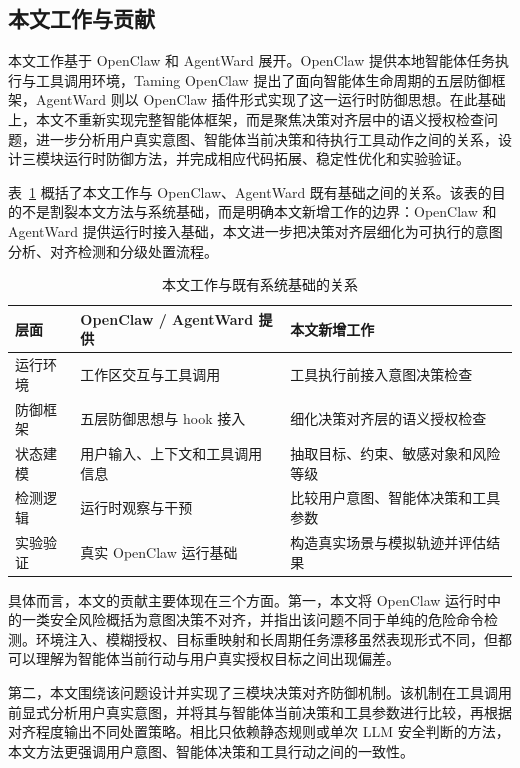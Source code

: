 \subsection{本文工作与贡献}

本文工作基于 OpenClaw 和 AgentWard 展开。OpenClaw 提供本地智能体任务执行与工具调用环境，Taming OpenClaw 提出了面向智能体生命周期的五层防御框架，AgentWard 则以 OpenClaw 插件形式实现了这一运行时防御思想\cite{openclaw2026github,deng2026taming,zhang2026agentward}。在此基础上，本文不重新实现完整智能体框架，而是聚焦决策对齐层中的语义授权检查问题，进一步分析用户真实意图、智能体当前决策和待执行工具动作之间的关系，设计三模块运行时防御方法，并完成相应代码拓展、稳定性优化和实验验证。

表~\ref{tab:chap01-contributions} 概括了本文工作与 OpenClaw、AgentWard 既有基础之间的关系。该表的目的不是割裂本文方法与系统基础，而是明确本文新增工作的边界：OpenClaw 和 AgentWard 提供运行时接入基础，本文进一步把决策对齐层细化为可执行的意图分析、对齐检测和分级处置流程。

\begin{table}[htbp]
  \centering
  \caption{本文工作与既有系统基础的关系}
  \label{tab:chap01-contributions}
  \small
  \renewcommand{\arraystretch}{1.25}
  \begin{tabular}{@{}p{}p{}p{}@{}}
    \toprule
    层面 & OpenClaw / AgentWard 提供 & 本文新增工作 \\
    \midrule
    运行环境 &
    工作区交互与工具调用 &
    工具执行前接入意图决策检查 \\
    防御框架 &
    五层防御思想与 hook 接入 &
    细化决策对齐层的语义授权检查 \\
    状态建模 &
    用户输入、上下文和工具调用信息 &
    抽取目标、约束、敏感对象和风险等级 \\
    检测逻辑 &
    运行时观察与干预 &
    比较用户意图、智能体决策和工具参数 \\
    实验验证 &
    真实 OpenClaw 运行基础 &
    构造真实场景与模拟轨迹并评估结果 \\
    \bottomrule
  \end{tabular}
\end{table}

具体而言，本文的贡献主要体现在三个方面。第一，本文将 OpenClaw 运行时中的一类安全风险概括为意图决策不对齐，并指出该问题不同于单纯的危险命令检测。环境注入、模糊授权、目标重映射和长周期任务漂移虽然表现形式不同，但都可以理解为智能体当前行动与用户真实授权目标之间出现偏差。

第二，本文围绕该问题设计并实现了三模块决策对齐防御机制。该机制在工具调用前显式分析用户真实意图，并将其与智能体当前决策和工具参数进行比较，再根据对齐程度输出不同处置策略。相比只依赖静态规则或单次 LLM 安全判断的方法，本文方法更强调用户意图、智能体决策和工具行动之间的一致性。

